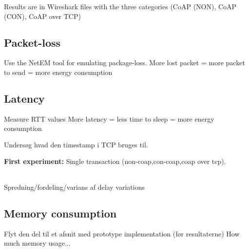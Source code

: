 Results are in Wireshark files with the three categories (CoAP (NON), CoAP (CON), CoAP over TCP)

\subsection{Packet-loss}
Use the NetEM tool for emulating package-loss.
More lost packet = more packet to send = more energy consumption

\subsection{Latency}
Measure RTT values %
More latency = less time to sleep = more energy consumption

Undersøg hvad den timestamp i TCP bruges til.

\textbf{First experiment:} Single transaction (non-coap,con-coap,coap over tcp).
\\ \\
Spredning/fordeling/varians af delay variations 

\subsection{Memory consumption}
Flyt den del til et afsnit med prototype implementation (før resultaterne)
How much memory usage...



